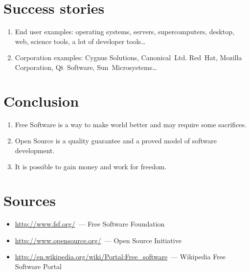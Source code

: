 \documentclass[10pt,a4paper]{article}
\newcommand{\bee}{\begin{enumerate}}
\newcommand{\ene}{\end{enumerate}}
\newcommand{\bit}{\begin{itemize}}
\newcommand{\eit}{\end{itemize}}
\begin{document}
\section{Success stories}
\bee
  \item End user examples: operating systems, servers, supercomputers, desktop, web, science tools, 
a lot of developer tools\dots
  \item Corporation examples: Cygnus Solutions, Canonical~Ltd. Red~Hat, Mozilla Corporation, Qt~Software, 
Sun~Microsystems\dots
\ene

\section{Conclusion}
\bee
  \item Free Software is a way to make world better and may require some sacrifices.
  \item Open Source is a quality guarantee and a proved model of software development.
  \item It is possible to gain money and work for freedom.
\ene

\section*{Sources}
  \bit
    \item \url{http://www.fsf.org/}~--- Free Software Foundation
    \item \url{http://www.opensource.org/}~--- Open Source Initiative
    \item \url{http://en.wikipedia.org/wiki/Portal:Free_software}~--- Wikipedia Free Software Portal
  \eit
\end{document}
